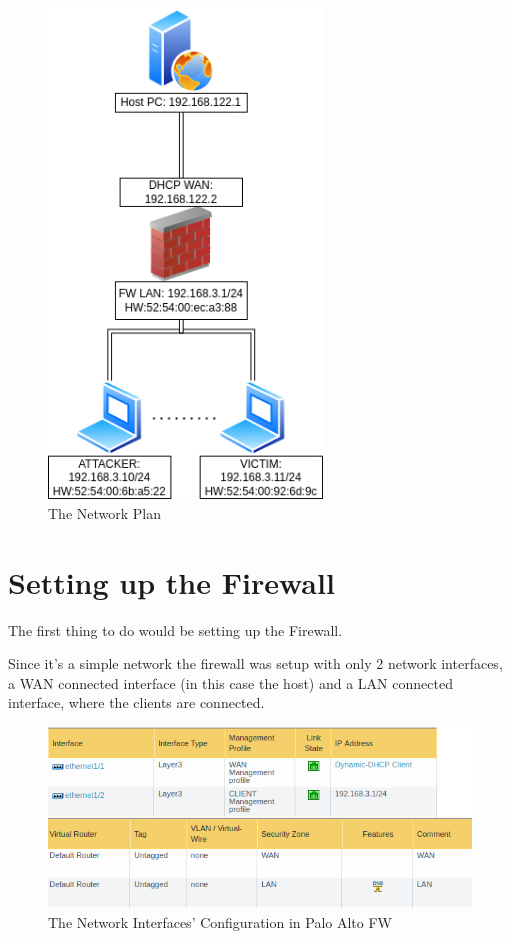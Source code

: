 \documentclass[status=normal,cover=tesi,language=en]{gmeepd}
\begin{document}
\begin{figure}[h!]
 \centering
 \includegraphics[height=13cm]{img/Network_Plan.png}
 \caption{The Network Plan}
 \label{fig: network-plan}
\end{figure}



\pagebreak

\section{Setting up the Firewall}

The first thing to do would be setting up the Firewall.

Since it's a simple network the firewall was setup with only 2 network interfaces, a WAN connected interface (in this case the host) and a LAN connected interface, where the clients are connected.

\begin{figure}[!hb]
 \centering
 \includegraphics[width=13cm]{img/network_config.png}
 \caption{The Network Interfaces' Configuration in Palo Alto FW}
 \label{Network Interfaces Configuration}
\end{figure}
\end{document}
